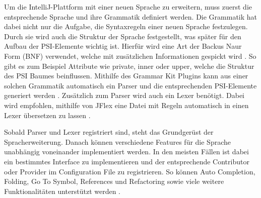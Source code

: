   Um die IntelliJ-Plattform mit einer neuen Sprache zu erweitern, muss zuerst die entsprechende
  Sprache und ihre Grammatik definiert werden. Die Grammatik hat dabei nicht nur die Aufgabe, die 
  Syntaxregeln einer neuen Sprache festzulegen. Durch sie wird auch die Struktur der Sprache festgestellt,
  was später für den Aufbau der PSI-Elemente wichtig ist. Hierfür wird eine Art der Backus Naur Form (BNF)
  verwendet, welche mit zusätzlichen Informationen gespickt wird \cite{mccracken2003backus,GrammarKit}. 
  So gibt es zum Beispiel Attribute
  wie private, inner oder upper, welche die Struktur des PSI Baumes beinflussen. Mithilfe des Grammar Kit Plugins
  kann aus einer solchen Grammatik automatisch ein Parser und die entsprechenden PSI-Elemente generiert werden
  \cite{IntelliJPlatformSDKLanguageTutorialGrammar}. 
  Zusätzlich zum Parser wird auch ein Lexer benötigt. Dabei wird empfohlen, mithilfe von JFlex
  eine Datei mit Regeln automatisch in einen Lexer übersetzen zu lassen 
  \cite{JFlex,klein2010jflex,IntelliJPlatformSDKLanguageTutorialLexer}.

  Sobald Parser und Lexer registriert sind, steht das Grundgerüst der Spracherweiterung. Danach können
  verschiedene Features für die Sprache unabhängig voneinander implementiert werden. In den meisten
  Fällen ist dabei ein bestimmtes Interface zu implementieren und der entsprechende Contributor oder
  Provider im Configuration File zu registrieren. So können Auto Completion, Folding, Go To Symbol,
  References und Refactoring sowie viele weitere Funktionalitäten unterstützt werden
  \cite{IntelliJPlatformSDKCustomLanguageSupport,IntelliJPlatformSDKLanguageTutorial}.

